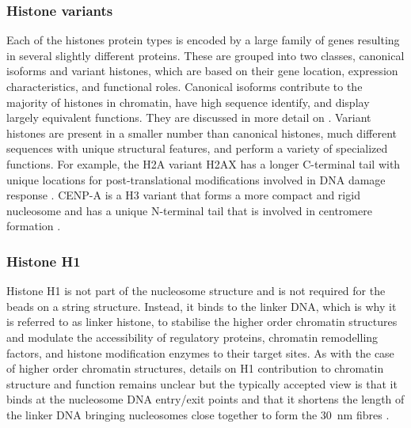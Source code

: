     \subsubsection{Histone variants}

      Each of the histones protein types is encoded by a large family
      of genes resulting in several slightly different proteins.
      These are grouped into two classes, canonical isoforms
      and variant histones, which are based on their gene location,
      expression characteristics, and functional roles.
      Canonical isoforms contribute to the majority
      of histones in chromatin, have high sequence identify, and display
      largely equivalent functions.  They are discussed in more detail on
      .
      Variant histones are present in a smaller number than canonical
      histones, much different sequences with unique structural features,
      and perform a variety of specialized functions.  For example, the
      H2A variant H2AX has a longer C-terminal tail with unique locations
      for post-translational modifications involved in DNA damage
      response .  CENP-A is a H3 variant that
      forms a more compact and rigid nucleosome and has a unique N-terminal
      tail that is involved in centromere formation \citep{black2011-cenpa}.

    \subsubsection{Histone H1}

      Histone H1 is not part of the nucleosome structure and is not
      required for the beads on a string structure.
      Instead, it binds to the linker DNA, which is why it is referred
      to as linker histone, to stabilise the higher order
      chromatin structures and modulate the accessibility of
      regulatory proteins,
      chromatin remodelling factors, and histone modification enzymes
      to their target sites.
      As with the case of higher order chromatin structures, details
      on H1 contribution to chromatin structure and function remains
      unclear but the typically accepted view is that it binds at
      the nucleosome DNA entry/exit points and that it shortens the
      length of the linker DNA bringing nucleosomes close together
      to form the \SI{30}{\nm} fibres \citep{harshman2013h1-review}.

